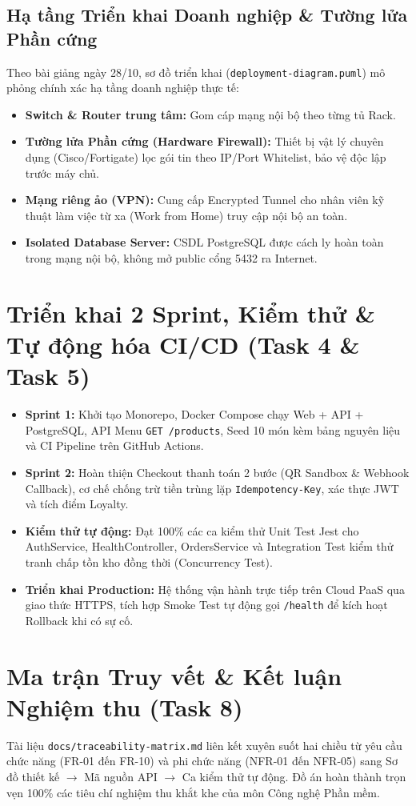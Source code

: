\documentclass[12pt,a4paper]{article}
\begin{document}
\subsection{Hạ tầng Triển khai Doanh nghiệp & Tường lửa Phần cứng}
Theo bài giảng ngày 28/10, sơ đồ triển khai (\texttt{deployment-diagram.puml}) mô phỏng chính xác hạ tầng doanh nghiệp thực tế:
\begin{itemize}[noitemsep]
    \item \textbf{Switch \& Router trung tâm:} Gom cáp mạng nội bộ theo từng tủ Rack.
    \item \textbf{Tường lửa Phần cứng (Hardware Firewall):} Thiết bị vật lý chuyên dụng (Cisco/Fortigate) lọc gói tin theo IP/Port Whitelist, bảo vệ độc lập trước máy chủ.
    \item \textbf{Mạng riêng ảo (VPN):} Cung cấp Encrypted Tunnel cho nhân viên kỹ thuật làm việc từ xa (Work from Home) truy cập nội bộ an toàn.
    \item \textbf{Isolated Database Server:} CSDL PostgreSQL được cách ly hoàn toàn trong mạng nội bộ, không mở public cổng 5432 ra Internet.
\end{itemize}

\section{Triển khai 2 Sprint, Kiểm thử & Tự động hóa CI/CD (Task 4 \& Task 5)}
\begin{itemize}[noitemsep]
    \item \textbf{Sprint 1:} Khởi tạo Monorepo, Docker Compose chạy Web + API + PostgreSQL, API Menu \texttt{GET /products}, Seed 10 món kèm bảng nguyên liệu và CI Pipeline trên GitHub Actions.
    \item \textbf{Sprint 2:} Hoàn thiện Checkout thanh toán 2 bước (QR Sandbox \& Webhook Callback), cơ chế chống trừ tiền trùng lặp \texttt{Idempotency-Key}, xác thực JWT và tích điểm Loyalty.
    \item \textbf{Kiểm thử tự động:} Đạt 100\% các ca kiểm thử Unit Test Jest cho AuthService, HealthController, OrdersService và Integration Test kiểm thử tranh chấp tồn kho đồng thời (Concurrency Test).
    \item \textbf{Triển khai Production:} Hệ thống vận hành trực tiếp trên Cloud PaaS qua giao thức HTTPS, tích hợp Smoke Test tự động gọi \texttt{/health} để kích hoạt Rollback khi có sự cố.
\end{itemize}

\section{Ma trận Truy vết & Kết luận Nghiệm thu (Task 8)}
Tài liệu \texttt{docs/traceability-matrix.md} liên kết xuyên suốt hai chiều từ yêu cầu chức năng (FR-01 đến FR-10) và phi chức năng (NFR-01 đến NFR-05) sang Sơ đồ thiết kế $\rightarrow$ Mã nguồn API $\rightarrow$ Ca kiểm thử tự động. Đồ án hoàn thành trọn vẹn 100\% các tiêu chí nghiệm thu khắt khe của môn Công nghệ Phần mềm.
\end{document}

